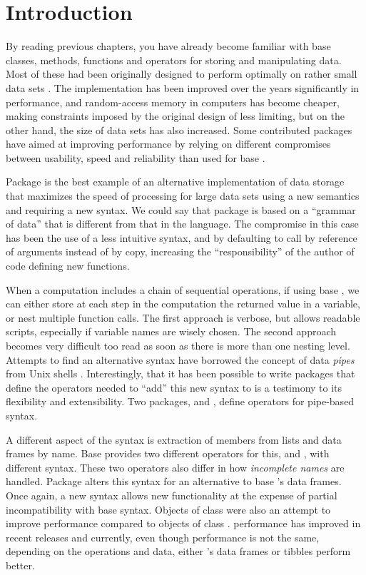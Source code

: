 \documentclass[krantz2]{krantz}\usepackage{knitr}
\begin{document}
\section{Introduction}

By reading previous chapters, you have already become familiar with base \Rlang classes, methods, functions and operators for storing and manipulating data. Most of these had been originally designed to perform optimally on rather small data sets \autocite[see][]{Matloff2011}. The \Rlang implementation has been improved over the years significantly in performance, and random-access memory in computers has become cheaper, making constraints imposed by the original design of \Rlang less limiting, but on the other hand, the size of data sets has also increased. Some contributed packages have aimed at improving performance by relying on different compromises between usability, speed and reliability than used for base \Rlang.

Package  is the best example of an alternative implementation of data storage that maximizes the speed of processing for large data sets using a new semantics and requiring a new syntax. We could say that package  is based on a ``grammar of data'' that is different from that in the \Rlang language. The compromise in this case has been the use of a less intuitive syntax, and by defaulting to call by reference of arguments instead of by copy, increasing the ``responsibility'' of the author of code defining new functions.

When a computation includes a chain of sequential operations, if using base \Rlang, we can either store at each step in the computation the returned value in a variable, or nest multiple function calls. The first approach is verbose, but allows readable scripts, especially if variable names are wisely chosen. The second approach becomes very difficult too read as soon as there is more than one nesting level. Attempts to find an alternative syntax have borrowed the concept of data \emph{pipes} from Unix shells \autocite{Kernigham1981}. Interestingly, that it has been possible to write packages that define the operators needed to ``add'' this new syntax to \Rlang is a testimony to its flexibility and extensibility. Two packages,  and , define operators for pipe-based syntax.

A different aspect of the \Rlang syntax is extraction of members from lists and data frames by name. Base \Rlang provides two different operators for this, \code{\$} and \code{[[]]}, with different syntax. These two operators also differ in how \emph{incomplete names} are handled. Package  alters this syntax for an alternative to base \Rlang's data frames. Once again, a new syntax allows new functionality at the expense of partial incompatibility with base \Rlang syntax. Objects of class  were also an attempt to improve performance compared to objects of class . \Rlang performance has improved in recent releases and currently, even though performance is not the same, depending on the operations and data, either \Rlang's data frames or tibbles perform better.
\end{document}
